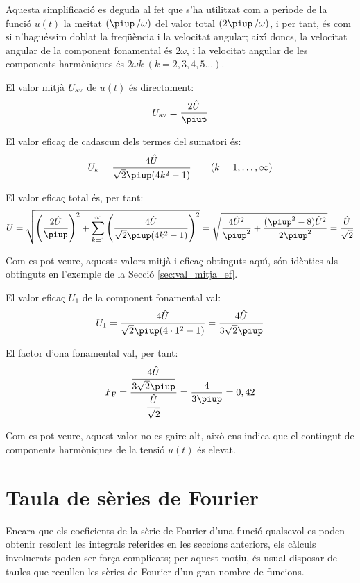 \begin{exemple}
Aquesta simplificaci\'{o} es deguda al fet que s'ha utilitzat com a
per\'{\i}ode de la funci\'{o} $u(t)$ la meitat $(\piup\,/\omega)$ del valor total
$(2\piup\,/\omega)$, i per tant, \'{e}s com si n'hagu\'{e}ssim doblat la
freq\"{u}\`{e}ncia i la velocitat angular; aix\'{\i} doncs, la velocitat angular
de la component fonamental \'{e}s $2\omega$, i la velocitat angular de
les components harm\`{o}niques \'{e}s $2\omega k \;(k=2,3,4,5\ldots)$.

El valor mitj\`{a} $U_\mathrm{av}$ de $u(t)$ \'{e}s directament:
\[
    U\ped{av} = \frac{2\hat{U}}{\piup}
\]

El valor efica\c{c} de cadascun dels termes del sumatori \'{e}s:
\[
    U_k =\frac{4\hat{U}}{\sqrt{2}\piup(4k^2-1)}
    \qquad(k=1,\ldots,\infty)
\]

El valor efica\c{c} total \'{e}s, per tant:
\[
    U=\sqrt{\left(\frac{2\hat{U}}{\piup}\right)^2 + \sum_{k=1}^\infty
    \left(\frac{4\hat{U}}{\sqrt{2}\piup(4k^2-1)}\right)^2} =
    \sqrt{\frac{4\hat{U}^2}{\piup^2} + \frac{(\piup^2-8)\hat{U}^2}{2\piup^2}
    }= \frac{\hat{U}}{\sqrt{2}}
\]

Com es pot veure, aquests valors mitj\`{a} i efica\c{c} obtinguts aqu\'{\i}, s\'{o}n
id\`{e}ntics als obtinguts en l'exemple de la Secci\'{o}
\ref{sec:val_mitja_ef}.

El valor efica\c{c} $U_1$ de la component fonamental val:
\[
    U_1 =\frac{4\hat{U}}{\sqrt{2}\piup(4\cdot 1^2-1)} =
    \frac{4\hat{U}}{3\sqrt{2}\piup}
\]

El factor d'ona fonamental val, per tant:
\[
    F\ped{F} =
    \frac{\dfrac{4\hat{U}}{3\sqrt{2}\piup}}{\dfrac{\hat{U}}{\sqrt{2}}}
    =\frac{4}{3\piup} = 0,{42}
\]

Com es pot veure, aquest valor no es gaire alt, aix\`{o} ens indica que
el contingut de components harm\`{o}niques de la tensi\'{o} $u(t)$ \'{e}s
elevat.

\end{exemple}


\section{Taula de s\`{e}ries de Fourier}

Encara que els coeficients de la s\`{e}rie de Fourier d'una funci\'{o} qualsevol es poden
obtenir resolent les integrals referides en les seccions anteriors, els c\`{a}lculs
involucrats poden ser for\c{c}a complicats; per aquest motiu, \'{e}s usual
disposar de taules que recullen les s\`{e}ries de Fourier d'un
gran nombre de funcions.

